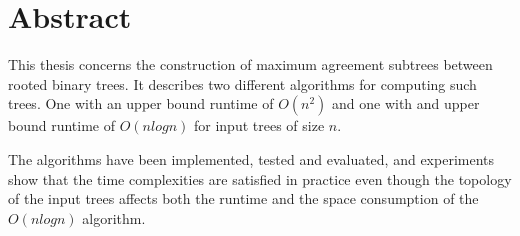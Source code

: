 \chapter*{Abstract}
This thesis concerns the construction of maximum agreement subtrees between rooted binary trees. It describes two different algorithms for computing such trees. One with an upper bound runtime of $O(n^2)$ and one with and upper bound runtime of $O(nlogn)$ for input trees of size $n$.

The algorithms have been implemented, tested and evaluated, and experiments show that the time complexities are satisfied in practice even though the topology of the input trees affects both the runtime and the space consumption of the $O(nlogn)$ algorithm.

\todo{\dots}